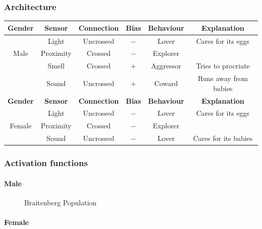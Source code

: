 \documentclass[a4paper]{article}
\begin{document}
\subsubsection{Architecture}
\begin{tabular}{| c | c | c | c | c | c |}
 \hline
  \textbf{Gender} & \textbf{Sensor} & \textbf{Connection} & \textbf{Bias} & \textbf{Behaviour} & \textbf{Explanation} \\
 \hline
  & Light & Uncrossed & $-$ & Lover & Cares for its eggs \\
  Male & Proximity & Crossed & $-$ & Explorer &  \\
  & Smell & Crossed & $+$ & Aggressor & Tries to procriate \\
  & Sound & Uncrossed & $+$ & Coward & Runs away from babies \\
 \hline
  \textbf{Gender} & \textbf{Sensor} & \textbf{Connection} & \textbf{Bias} & \textbf{Behaviour} & \textbf{Explanation} \\
 \hline
  & Light & Uncrossed & $-$ & Lover & Cares for its eggs \\
  Female & Proximity & Crossed & $-$ & Explorer &  \\
  & Sound & Uncrossed & $-$ & Lover & Cares for its babies \\
 \hline
\end{tabular}

\subsubsection{Activation functions}
\paragraph{Male}
\begin{figure}[h]
	\centering

	\caption{Braitenberg Population}
\end{figure}

\paragraph{Female}
\end{document}
